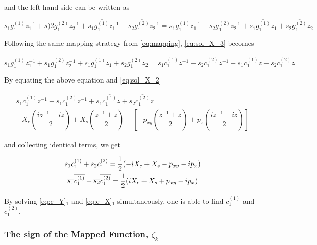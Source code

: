 \documentclass{article}
\begin{document}
and the left-hand side can be written as

\begin{equation}
    s_1 g_1^{(1)} z_1^{-1} + s)2 g_1^{(2)} z_2^{-1} + \overline{s_1} \overline{g_1^{(1)}} \overline{z_1^{-1}} + \overline{s_2} \overline{g_1^{(2)}} \overline{z_2^{-1}} = \overline{s_1} g_1^{(1)} z_1^{-1} + \overline{s_2} g_1^{(2)} z_2^{-1} + \overline{s_1} \overline{g_1^{(1)}} z_1 + \overline{s_2} \overline{g_1^{(2)}} z_2
    \label{eq:sol_X_3}
\end{equation}

Following the same mapping strategy from \cref{eq:mapping}, \cref{eq:sol_X_3} becomes

\begin{equation*}
    s_1 g_1^{(1)} z_1^{-1} + s_1 g_1^{(2)} z_2^{-1} + \overline{s_1} \overline{g_1^{(1)}} z_1 + \overline{s_2} \overline{g_1^{(2)}} z_2 = s_1 c_1^{(1)} z^{-1} + s_2 c_1^{(2)} z^{-1} + \overline{s_1} \overline{c_1^{(1)}} z + \overline{s_2} \overline{c_1^{(2)}} z
\end{equation*}

By equating the above equation and \cref{eq:sol_X_2}

\begin{multline*}
    s_1 c_1^{(1)} z^{-1} + s_1 c_1^{(2)} z^{-1} + \overline{s_1} \overline{c_1^{(1)}} z + \overline{s_2} \overline{c_1^{(2)}} z = \\
    -X_c \left(\dfrac{iz^{-1} - iz}{2}\right) + X_s \left(\dfrac{z^{-1} + z}{2}\right) - \left[ -p_{xy} \left(\dfrac{z^{-1} + z}{2}\right) + p_x \left(\dfrac{iz^{-1} - iz}{2}\right) \right]
\end{multline*}

and collecting identical terms, we get

\begin{gather}
    s_1 c_1^{(1)} + s_2 c_1^{(2)} = \dfrac{1}{2} (-i X_c + X_s - p_{xy} - i p_x) \notag \\
    \overline{s_1}\overline{c_1^{(1)}} + \overline{s_2}\overline{c_1^{(2)}} = \dfrac{1}{2} (i X_c + X_s + p_{xy} + i p_x) 
    \label{eq:c_X}
\end{gather}

By solving \cref{eq:c_Y}$_1$ and \cref{eq:c_X}$_1$ simultaneously, one is able to find $c_1^{(1)}$ and $c_1^{(2)}$. \\

\subsubsection{The sign of the Mapped Function, \texorpdfstring{$\zeta_k$}{}}
\end{document}

